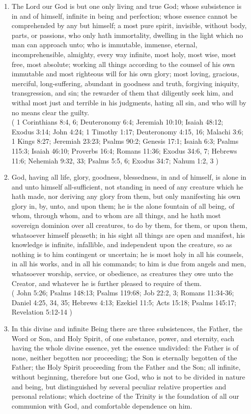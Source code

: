 \documentclass[12pt,a4paper]{book}
\begin{document}
\begin{enumerate}
\item The Lord our God is but one only living and true God; whose subsistence is in and of himself, infinite in being and perfection; whose essence cannot be comprehended by any but himself; a most pure spirit, invisible, without body, parts, or passions, who only hath immortality, dwelling in the light which no man can approach unto; who is immutable, immense, eternal, incomprehensible, almighty, every way infinite, most holy, most wise, most free, most absolute; working all things according to the counsel of his own immutable and most righteous will for his own glory; most loving, gracious, merciful, long-suffering, abundant in goodness and truth, forgiving iniquity, transgression, and sin; the rewarder of them that diligently seek him, and withal most just and terrible in his judgments, hating all sin, and who will by no means clear the guilty.\\
( 1 Corinthians 8:4, 6; Deuteronomy 6:4; Jeremiah 10:10; Isaiah 48:12; Exodus 3:14; John 4:24; 1 Timothy 1:17; Deuteronomy 4:15, 16; Malachi 3:6; 1 Kings 8:27; Jeremiah 23:23; Psalms 90:2; Genesis 17:1; Isaiah 6:3; Psalms 115:3; Isaiah 46:10; Proverbs 16:4; Romans 11:36; Exodus 34:6, 7; Hebrews 11:6; Nehemiah 9:32, 33; Psalms 5:5, 6; Exodus 34:7; Nahum 1:2, 3 )
\item God, having all life, glory, goodness, blessedness, in and of himself, is alone in and unto himself all-sufficient, not standing in need of any creature which he hath made, nor deriving any glory from them, but only manifesting his own glory in, by, unto, and upon them; he is the alone fountain of all being, of whom, through whom, and to whom are all things, and he hath most sovereign dominion over all creatures, to do by them, for them, or upon them, whatsoever himself pleaseth; in his sight all things are open and manifest, his knowledge is infinite, infallible, and independent upon the creature, so as nothing is to him contingent or uncertain; he is most holy in all his counsels, in all his works, and in all his commands; to him is due from angels and men, whatsoever worship, service, or obedience, as creatures they owe unto the Creator, and whatever he is further pleased to require of them.\\
( John 5:26; Psalms 148:13; Psalms 119:68; Job 22:2, 3; Romans 11:34-36; Daniel 4:25, 34, 35; Hebrews 4:13; Ezekiel 11:5; Acts 15:18; Psalms 145:17; Revelation 5:12-14 )
\item In this divine and infinite Being there are three subsistences, the Father, the Word or Son, and Holy Spirit, of one substance, power, and eternity, each having the whole divine essence, yet the essence undivided: the Father is of none, neither begotten nor proceeding; the Son is eternally begotten of the Father; the Holy Spirit proceeding from the Father and the Son; all infinite, without beginning, therefore but one God, who is not to be divided in nature and being, but distinguished by several peculiar relative properties and personal relations; which doctrine of the Trinity is the foundation of all our communion with God, and comfortable dependence on him.\\

\end{enumerate}
\end{document}
